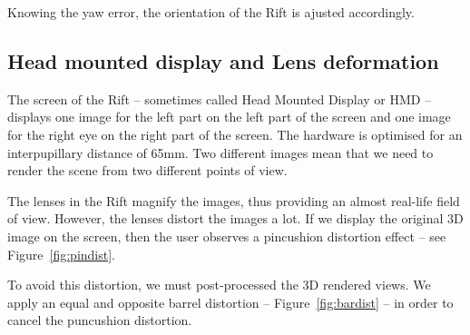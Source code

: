 \documentclass[12pt, twoside]{article}
\begin{document}
Knowing the yaw error, the orientation of the Rift is ajusted accordingly.

\subsection{Head mounted display and Lens deformation}
\label{subsec:lensdef}
The screen of the Rift -- sometimes called Head Mounted Display or HMD -- displays one image for the left part on the left part of the screen and one image for the right eye on the right part of the screen. The hardware is optimised for an interpupillary distance of 65mm. Two different images mean that we need to render the scene from two different points of view.

The lenses in the Rift magnify the images, thus providing an almost real-life field of view. However, the lenses distort the images a lot. If we display the original 3D image on the screen, then the user observes a pincushion distortion effect \cite{OVRDoc} -- see Figure~\ref{fig:pindist}.

To avoid this distortion, we must post-processed the 3D rendered views. We apply an equal and opposite barrel distortion -- Figure~\ref{fig:bardist} -- in order to cancel the puncushion distortion.
\end{document}
